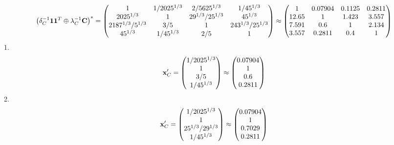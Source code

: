 \documentclass[10pt,a4paper]{article}
\begin{document}
	\[
		\left(\delta_{C}^{-1}\bold{11}^T \oplus \lambda_{C}^{-1}\bold{C}\right)^* = 
		\begin{pmatrix}
			{1}{} & {1} / {{2025^ {1 / 3}}} & {{2}} / {{5625^ {1 / 3}}} & {1} / {{45^ {1 / 3}}} \\
			{{2025^ {1 / 3}}}{} & {1}{} & {{2}{9^ {1 / 3}}} / {{25^ {1 / 3}}} & {{45^ {1 / 3}}}{} \\
			{{2187^ {1 / 3}}} / {{5^ {1 / 3}}} & {{3}} / {{5}} & {1}{} & {{243^ {1 / 3}}} / {{25^ {1 / 3}}} \\
			{{45^ {1 / 3}}}{} & {1} / {{45^ {1 / 3}}} & {{2}} / {{5}} & {1}{} \\
		\end{pmatrix}
		\approx
		\begin{pmatrix}
			1        & 0.07904  & 0.1125   & 0.2811   \\
			12.65    & 1        & 1.423    & 3.557    \\
			7.591    & 0.6      & 1        & 2.134    \\
			3.557    & 0.2811   & 0.4      & 1        \\
		\end{pmatrix}
	\]
	1.
	\[
		\bold{x}'_{C} = 
		\begin{pmatrix}
			{1} / {{2025^ {1 / 3}}} \\
			{1}{} \\
			{{3}} / {{5}} \\
			{1} / {{45^ {1 / 3}}} \\
		\end{pmatrix}
		\approx
		\begin{pmatrix}
			0.07904  \\
			1        \\
			0.6      \\
			0.2811   \\
		\end{pmatrix}
	\]
	2.
	\[
		\bold{x}'_{C} = 
		\begin{pmatrix}
			{1} / {{2025^ {1 / 3}}} \\
			{1}{} \\
			{{25^ {1 / 3}}} / {{2}{9^ {1 / 3}}} \\
			{1} / {{45^ {1 / 3}}} \\
		\end{pmatrix}
		\approx
		\begin{pmatrix}
			0.07904  \\
			1        \\
			0.7029   \\
			0.2811   \\
		\end{pmatrix}
	\]
\end{document}
